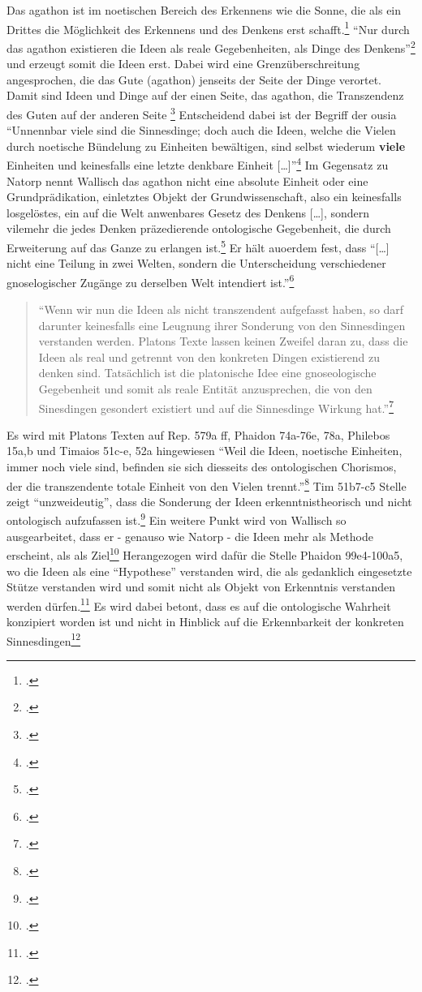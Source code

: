 \documentclass[12pt]{article}
\newcommand*{\zitatblock}[1]{%
    \begin{quote}
    \fontsize{10}{12}\selectfont
    \setlength{\parskip}{1.0em}
    #1
    \end{quote}
}
\begin{document}
Das agathon ist im noetischen Bereich des Erkennens wie die Sonne, die als ein Drittes die Möglichkeit des Erkennens und des Denkens erst schafft.\footcite[vgl.][S. 10]{Wallisch} 
\enquote{Nur durch das agathon existieren die Ideen als reale Gegebenheiten, als Dinge des Denkens}\footcite[][S. 11]{Wallisch} und erzeugt somit die Ideen erst. Dabei wird eine Grenzüberschreitung angesprochen, die das Gute (agathon) jenseits der Seite der Dinge verortet. Damit sind Ideen und Dinge auf der einen Seite, das agathon, die Transzendenz des Guten auf der anderen Seite \footcite[vgl.][S. 11]{Wallisch}
Entscheidend dabei ist der Begriff der ousia
\enquote{Unnennbar viele sind die Sinnesdinge; doch auch die Ideen, welche die Vielen durch noetische Bündelung zu Einheiten bewältigen, sind selbst wiederum \textbf{viele} Einheiten und keinesfalls eine letzte denkbare Einheit [\dots]}\footcite[vgl.][S. 12]{Wallisch}
Im Gegensatz zu Natorp nennt Wallisch das agathon nicht eine absolute Einheit oder eine Grundprädikation, einletztes Objekt der Grundwissenschaft, also ein keinesfalls losgelöstes, ein auf die Welt anwenbares Gesetz des Denkens [\dots], sondern vilemehr die jedes Denken präzedierende ontologische Gegebenheit, die durch Erweiterung auf das Ganze zu erlangen ist.\footcite[vgl.][S. 14]{Wallisch}
Er hält auoerdem fest, dass \enquote{[\dots] nicht eine Teilung in zwei Welten, sondern die Unterscheidung verschiedener gnoselogischer Zugänge zu derselben Welt intendiert ist.}\footcite[vgl.][S. 15]{Wallisch}
\zitatblock{\enquote{Wenn wir nun die Ideen als nicht transzendent aufgefasst haben, so darf darunter keinesfalls eine Leugnung ihrer Sonderung von den Sinnesdingen verstanden werden. Platons Texte lassen keinen Zweifel daran zu, dass die Ideen als real und getrennt von den konkreten Dingen existierend zu denken sind. Tatsächlich ist die platonische Idee eine gnoseologische Gegebenheit und somit als reale Entität anzusprechen, die von den Sinesdingen gesondert existiert und auf die Sinnesdinge Wirkung hat.}\footcite[][S. 17]{Wallisch}}
Es wird mit Platons Texten auf Rep. 579a ff, Phaidon 74a-76e, 78a, Philebos 15a,b und Timaios 51c-e, 52a hingewiesen
\enquote{Weil die Ideen, noetische Einheiten, immer noch viele sind, befinden sie sich diesseits des ontologischen Chorismos, der die transzendente totale Einheit von den Vielen trennt.}\footcite[][S. 17]{Wallisch}
Tim 51b7-c5 Stelle zeigt \enquote{unzweideutig}, dass die Sonderung der Ideen erkenntnistheorisch und nicht ontologisch aufzufassen ist.\footcite[vgl.][S. 19]{Wallisch}
Ein weitere Punkt wird von Wallisch so ausgearbeitet, dass er - genauso wie Natorp - die Ideen mehr als Methode erscheint, als als Ziel\footcite[vgl.][S. 26]{Wallisch} Herangezogen wird dafür die Stelle Phaidon 99e4-100a5, wo die Ideen als eine \enquote{Hypothese} verstanden wird, die als gedanklich eingesetzte Stütze verstanden wird und somit nicht als Objekt von Erkenntnis verstanden werden dürfen.\footcite[vgl.][S. 26]{Wallisch} Es wird dabei betont, dass es auf die ontologische Wahrheit konzipiert worden ist und nicht in Hinblick auf die Erkennbarkeit der konkreten Sinnesdingen\footcite[vgl.][S. 27]{Wallisch}
\end{document}
